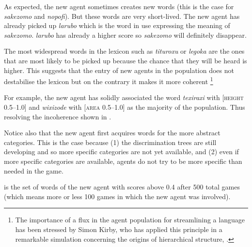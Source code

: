 As expected, the new 
agent sometimes creates new words (this is the case 
for \textit{sakezomo} and \textit{nopofi}). But these words are 
very short-lived. The new agent has already picked up 
\textit{larubo} which is the word in use expressing the 
meaning of \textit{sakezomo}. \textit{larubo} has already a higher 
score so \textit{sakezomo} will definitely disappear. 

The most widespread words in the lexicon 
such as \textit{tituroxu} or \textit{legoka} are the ones that 
are most likely to be picked up because the chance
that they will be heard is higher. This suggests
that the entry of new agents in the population does
not destabilise the lexicon but on the contrary 
it makes it more coherent \footnote{The importance of a flux in the agent population for
streamlining a language has been stressed by Simon Kirby, who 
has applied this principle in a remarkable simulation 
concerning the origins of hierarchical structure, \cite{Kirby:1999}.}

For example, the new agent
has solidly associated the word \textit{texiraxi} with 
{}[\textsc{height} 0.5–1.0] and \textit{wixizode} with [\textsc{area} 0.5–1.0]
as the majority of the population. Thus resolving the 
incoherence shown in . 

Notice also that the new agent first acquires words 
for the more abstract categories. This is the case 
because (1) the discrimination trees are still developing
and so more specific categories are not yet available, 
and (2) even if more specific categories are available, 
agents do not try to be more specific than needed in 
the game. 

 is the set of words of the new agent
with scores above 0.4 after 
500 total games (which means more or less 100 games 
in which the new agent was involved). 


